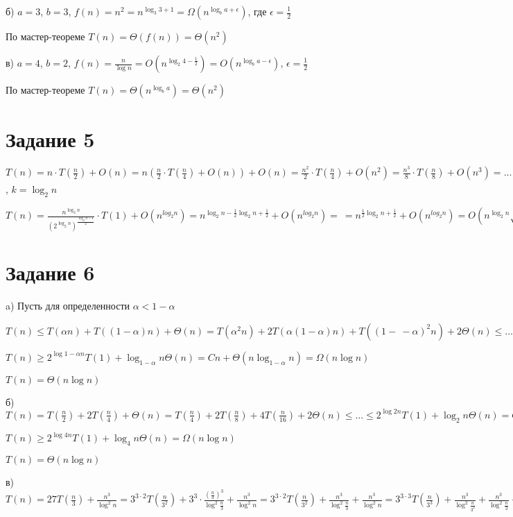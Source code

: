 \documentclass[a4paper,12pt]{article}
\begin{document}
б) $a=3$, $b=3$, $f(n)=n^2=n^{\log_{3}{3}+1}=\Omega(n^{\log_{b}{a}+\epsilon})$, где $\epsilon=\frac{1}{2}$

По мастер-теореме $T(n)=\Theta(f(n))=\Theta(n^2)$

в) $a=4$, $b=2$, $f(n)=\frac{n}{\log{n}}=O(n^{\log_{2}{4}-\frac{1}{2}})=O(n^{\log_{b}{a}-\epsilon})$, $\epsilon=\frac{1}{2}$

По мастер-теореме $T(n)=\Theta(n^{\log_{b}{a}})=\Theta(n^2)$

\section*{Задание 5}  
\hspace{0.5cm}
$T(n)=n\cdot T(\frac{n}{2})+O(n)=n\left( \frac{n}{2}\cdot T\left(\frac{n}{4}\right) +O(n)\right) +O(n)=\frac{n^2}{2}\cdot T(\frac{n}{4})+O(n^2)=\frac{n^3}{8}\cdot T(\frac{n}{8})+O(n^3)=...=\frac{n^k}{2^{\frac{k(k-1)}{2}}}\cdot T(\frac{n}{2^k})+O(n^k)$, $k=\log_{2}{n}$

$T(n)=\frac{n^{\log_{2}{n}}}{\left( 2^{\log_{2}{n}}\right)^{\frac{\log_{2}{n}-1}{2}}} \cdot T(1)+O(n^{log_{2}{n}})=n^{\log_{2}{n}-\frac{1}{2}\log_{2}{n}+\frac{1}{2}}+O(n^{log_{2}{n}})=\ =n^{\frac{1}{2}\log_{2}{n+\frac{1}{2}}}+O(n^{log_{2}{n}}) = O(n^{\log_{2}{n}}\sqrt{n})=\Omega(n^{\log_{2}{n}})$

\section*{Задание 6}  
\hspace{0.5cm}
a) Пусть для определенности $\alpha<1-\alpha$

$T(n)\leq T(\alpha n)+T((1-\alpha)n)+\Theta(n)=T(\alpha^2n)+2T(\alpha(1-\alpha)n)+T((1-\ -\alpha)^2 n)+2\Theta(n)\leq...\leq2^{\log_{\alpha}{n}}T(1)+\log_{\alpha}{n}\cdot\Theta(n)=Cn+\Theta(n\log_{\alpha}{n})=O(n\log{n})$

$T(n)\geq 2^{\log{1-\alpha}{n}}T(1)+\log_{1-\alpha}{n}\Theta(n)=Cn+\Theta(n\log_{1-\alpha}{n})=\Omega(n\log{n})$

$T(n)=\Theta(n\log{n})$

б) $T(n)=T(\frac{n}{2})+2T(\frac{n}{4})+\Theta(n)=T(\frac{n}{4})+2T(\frac{n}{8})+4T(\frac{n}{16})+2\Theta(n)\leq...\leq2^{\log{2}{n}}T(1)+\log_{2}{n}\Theta(n)=O(n\log{n})$

$T(n)\geq2^{\log{4}{n}}T(1)+\log_{4}{n}\Theta(n)=\Omega(n\log{n})$

$T(n)=\Theta(n\log{n})$

в) $T(n)=27T(\frac{n}{3})+\frac{n^3}{\log^2{n}}=3^{3\cdot 2}T(\frac{n}{3^2})+3^3\cdot\frac{\left( \frac{n}{3}\right) ^3}{\log^2{\frac{n}{3}}}+\frac{n^3}{\log^2{n}}=3^{3\cdot 2}T(\frac{n}{3^2})+\frac{n ^3}{\log^2{\frac{n}{3}}}+\frac{n^3}{\log^2{n}}=3^{3\cdot 3}T\left(\frac{n}{3^3} \right) +\frac{n^3}{\log^2{\frac{n}{3^2}}}+\frac{n^3}{\log^2{\frac{n}{3}}}+\frac{n^3}{\log^2{n}}=3^{3\cdot \log_{3}{n}}T(1)+n^3\sum\limits_{k=0}^{\log_{3}{n}-1}\frac{1}{\log^2{\frac{n}{3^k}}}=n^3T(1)+n^3\sum\limits_{k=0}^{\log_{3}{n}-1}\frac{1}{\log^2{\frac{n}{3^k}}}=\Omega(n^3)$
\end{document}
